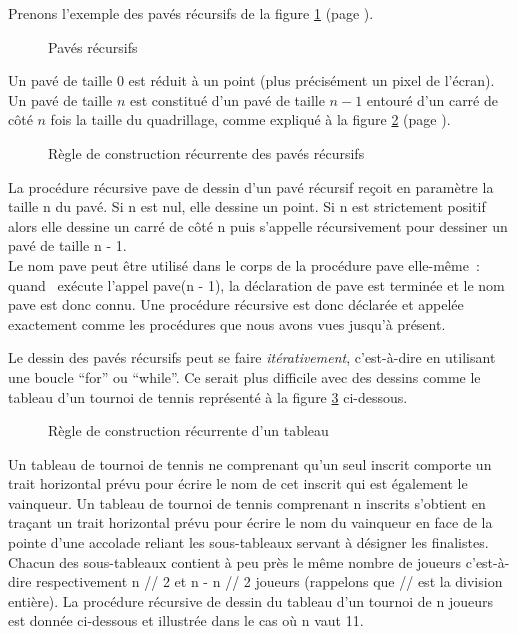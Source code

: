 Prenons l'exemple des pavés récursifs
de la figure \ref{fig:pavec} (page \pageref{fig:pavec}).
\begin{figure}[htbp]
 \caption{Pavés récursifs}\label{fig:pavec}
\end{figure}
Un pavé de taille 0 est réduit à un point (plus précisément un pixel de l'écran).
Un pavé de taille $n$ est constitué d'un pavé de taille $n - 1$
entouré d'un carré de côté $n$ fois la taille du quadrillage, comme expliqué à la
figure \ref{fig:indpavec} (page \pageref{fig:indpavec}).
\begin{figure}[htbp]
 \caption{Règle de construction récurrente des pavés récursifs}\label{fig:indpavec}
\end{figure}
La procédure récursive {\idt pave} de dessin d'un pavé récursif reçoit en paramètre la taille {\idt n}
du pavé. Si {\idt n} est nul, elle dessine un point. Si {\idt n} est strictement positif alors
elle dessine un carré de côté {\idt n} puis s'appelle récursivement pour dessiner un
pavé de taille {\idt n - 1}.
\ \\

\noindent Le nom {\idt pave} peut être utilisé dans le corps de la procédure {\idt pave}
elle-même~: quand \python\ exécute l'appel {\idt pave(n - 1)}, la déclaration de {\idt pave}
est terminée et le nom {\idt pave} est donc connu. Une procédure récursive est donc
déclarée et appelée exactement comme les procédures que nous avons vues jusqu'à présent.


Le dessin des pavés récursifs peut se faire {\em itérativement}, c'est-à-dire en utilisant 
une boucle ``for'' ou ``while''. Ce serait plus difficile avec des dessins comme le tableau d'un tournoi
de tennis représenté à la figure \ref{fig:tabtour} ci-dessous.
\begin{figure}[htbp]
 \caption{Règle de construction récurrente d'un tableau\label{fig:tabtour}}
\end{figure}

Un tableau de tournoi de tennis ne comprenant qu'un seul inscrit comporte un trait horizontal
prévu pour écrire le nom de cet inscrit qui est également le vainqueur. Un tableau de tournoi de 
tennis comprenant {\idt n} ins\-crits s'obtient en traçant un trait horizontal
prévu pour écrire le nom du vainqueur en face de la pointe d'une accolade reliant les 
sous-tableaux servant à désigner les finalistes. Chacun des sous-tableaux contient à peu près
le même nombre de joueurs c'est-à-dire respectivement {\idt n // 2} et
{\idt n - n // 2} joueurs (rappelons que {\idt //} est la division entière). La procédure récursive de dessin du tableau d'un 
tournoi de {\idt n} joueurs est donnée ci-dessous et illustrée dans le cas où {\idt n} vaut 11.

